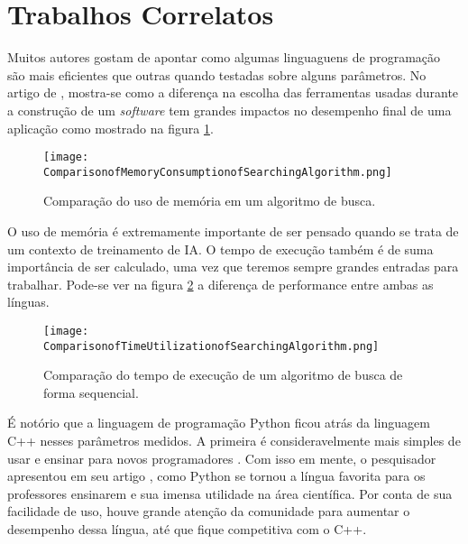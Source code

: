 \section{Trabalhos Correlatos}

Muitos autores gostam de apontar como algumas linguaguens de programação são mais eficientes que outras 
quando testadas sobre alguns parâmetros.
No artigo  de \citeauthor{C++vsPython}, mostra-se como a diferença na escolha das ferramentas
usadas durante a construção de um \emph{software} tem grandes impactos no desempenho final de uma aplicação como
mostrado na figura \ref{fig:comparisonMemorycppvspython}.

\begin{figure}[!ht]
    \centering
    \texttt{[image: ComparisonofMemoryConsumptionofSearchingAlgorithm.png]}
    \caption[a]{Comparação do uso de memória em um algoritmo de busca\footnotemark.}
    \label{fig:comparisonMemorycppvspython}
\end{figure}


O uso de memória é extremamente importante de ser pensado quando se trata de um contexto de treinamento
de IA. O tempo de execução também é de suma importância de ser calculado, uma vez que teremos sempre 
grandes entradas para trabalhar. Pode-se ver na figura \ref{fig:speedcppvspython} a diferença de performance
entre ambas as línguas.

\begin{figure}[!ht]
    \centering
    \texttt{[image: ComparisonofTimeUtilizationofSearchingAlgorithm.png]}
    \caption[a]{Comparação do tempo de execução de um algoritmo de busca de forma sequencial\footnotemark.}
    \label{fig:speedcppvspython}
\end{figure}


É notório que a linguagem de programação Python ficou atrás da linguagem C++ nesses parâmetros medidos. 
A primeira é consideravelmente mais simples de usar e ensinar para novos programadores \cite{C++vsPython}. 
Com isso em mente, o pesquisador \citeauthor{HPC_Python} apresentou em seu artigo ,
como Python se tornou a língua favorita para os professores ensinarem e sua imensa utilidade na área científica. 
Por conta de sua facilidade de uso, houve grande atenção da comunidade para aumentar o desempenho dessa língua, até
que fique competitiva com o C++.

